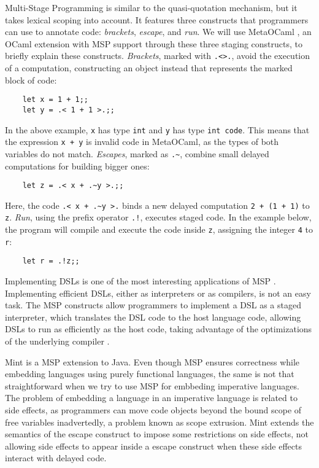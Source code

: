 \documentclass[english]{llncs}
\begin{document}
Multi-Stage Programming \cite{Taha1999MSP,Taha2004gentle,Taha2008gentle} is
similar to the quasi-quotation mechanism,
but it takes lexical scoping into account.
It features three constructs that programmers can use to
annotate code: \emph{brackets}, \emph{escape}, and \emph{run}.
We will use MetaOCaml \cite{Calcagno2003implementing}, an OCaml extension
with MSP support through these three staging constructs, to briefly explain
these constructs. \emph{Brackets}, marked with \texttt{.<>.}, avoid the execution of a computation,
constructing an object instead that represents the marked block of code:
\begin{verbatim}
    let x = 1 + 1;;
    let y = .< 1 + 1 >.;;
\end{verbatim}

In the above example, \texttt{x} has type \texttt{int} and \texttt{y} has
type \texttt{int code}.
This means that the expression \texttt{x + y} is invalid code in MetaOCaml,
as the types of both variables do not match. \emph{Escapes}, marked as \texttt{.\~}, combine small delayed computations for building
bigger ones:
\begin{verbatim}
    let z = .< x + .~y >.;;
\end{verbatim}

Here, the code \texttt{.< x + .\~{}y >.} binds a new delayed computation
\texttt{2 + (1 + 1)} to \texttt{z}. \emph{Run}, using the prefix operator \texttt{.!}, executes staged code.
In the example below, the program will compile and execute the code inside
\texttt{z}, assigning the integer \texttt{4} to \texttt{r}:

\begin{verbatim}
    let r = .!z;;
\end{verbatim}

Implementing DSLs is one of the most interesting applications of MSP \cite{Czarnecki2004DSL}.
Implementing efficient DSLs, either as interpreters or as compilers,
is not an easy task.
The MSP constructs allow programmers to implement a DSL as
a staged interpreter, which translates the DSL code to the host language code,
allowing DSLs to run as efficiently as the host code, taking advantage
of the optimizations of the underlying compiler \cite{Taha2004gentle}.

Mint \cite{Westbrook2010Mint} is a MSP extension to Java.
Even though MSP ensures correctness while embedding languages using
purely functional languages, the same is not that straightforward when
we try to use MSP for embbeding imperative languages.
The problem of embedding a language in an imperative language is
related to side effects, as programmers can move code objects
beyond the bound scope of free variables inadvertedly, a problem
known as scope extrusion.
Mint extends the semantics of the escape construct to impose
some restrictions on side effects, not allowing side effects to
appear inside a escape construct when these side effects interact
with delayed code.
\end{document}
